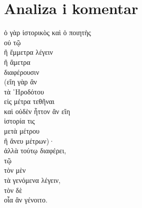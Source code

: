 \section*{Analiza i komentar}


{\large
\begin{greek}
\noindent  ὁ γὰρ ἱστορικὸς καὶ ὁ ποιητὴς \\
\tabto{2em} οὐ τῷ\\
\tabto{4em} ἢ ἔμμετρα λέγειν \\
\tabto{4em} ἢ ἄμετρα \\
\tabto{2em} διαφέρουσιν \\
(εἴη γὰρ ἂν \\
\tabto{2em} τὰ ῾Ηροδότου \\
\tabto{2em} εἰς μέτρα τεθῆναι \\
καὶ οὐδὲν ἧττον ἂν εἴη \\
\tabto{2em} ἱστορία τις \\
\tabto{4em} μετὰ μέτρου \\
\tabto{4em} ἢ ἄνευ μέτρων)· \\
ἀλλὰ τούτῳ διαφέρει, \\
\tabto{2em} τῷ \\
\tabto{4em} τὸν μὲν \\
\tabto{6em} τὰ γενόμενα λέγειν, \\
\tabto{4em} τὸν δὲ \\
\tabto{6em} οἷα ἂν γένοιτο.\\

\end{greek}
}

